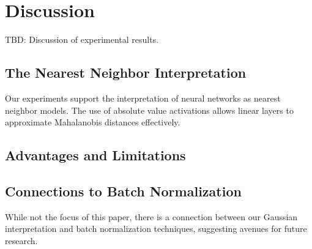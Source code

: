 
\section{Discussion}
\label{sec:discussion}
TBD: Discussion of experimental results.


\subsection{The Nearest Neighbor Interpretation}

Our experiments support the interpretation of neural networks as nearest neighbor models. The use of absolute value activations allows linear layers to approximate Mahalanobis distances effectively.


\subsection{Advantages and Limitations}


\subsection{Connections to Batch Normalization}

While not the focus of this paper, there is a connection between our Gaussian interpretation and batch normalization techniques, suggesting avenues for future research.


